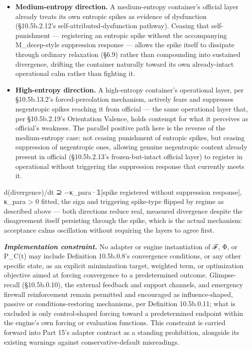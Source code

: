 \documentclass[
]{article}
\begin{document}
\begin{itemize}
\item
  \textbf{Medium-entropy direction.} A medium-entropy container's
  official layer already treats its own entropic spikes as evidence of
  dysfunction (§10.5b.2.12's self-attributed-dysfunction pathway).
  Ceasing that self-punishment --- registering an entropic spike without
  the accompanying M\_decep-style suppression response --- allows the
  spike itself to dissipate through ordinary relaxation (§6.9) rather
  than compounding into sustained divergence, drifting the container
  naturally toward its own already-intact operational calm rather than
  fighting it.
\item
  \textbf{High-entropy direction.} A high-entropy container's
  operational layer, per §10.5b.13.2's forced-percolation mechanism,
  actively fears and suppresses negentropic spikes reaching it from
  official --- the same operational layer that, per §10.5b.2.19's
  Orientation Valence, holds contempt for what it perceives as
  official's weakness. The parallel positive path here is the reverse of
  the medium-entropy case: not ceasing punishment of entropic spikes,
  but ceasing suppression of negentropic ones, allowing genuine
  negentropic content already present in official (§10.5b.2.13's
  frozen-but-intact official layer) to register in operational without
  triggering the suppression response that currently meets it.
\end{itemize}

d(divergence)/dt ⊇ −κ\_para·𝟙{[}spike registered without suppression
response{]}, κ\_para \textgreater{} 0 fitted, the sign and triggering
spike-type flipped by regime as described above --- both directions
reduce real, measured divergence despite the disagreement itself
persisting through the spike, which is the actual mechanism: acceptance
calms oscillation without requiring the layers to agree first.

\emph{\textbf{Implementation constraint.}} No adapter or engine
instantiation of ℱ, Φ, or P\_C(t) may include Definition 10.5b.0.8's
convergence conditions, or any other specific state, as an explicit
minimization target, weighted term, or optimization objective aimed at
forcing convergence to a predetermined outcome. Glimpse-recall
(§10.5b.0.10), the external feedback and support channels, and emergency
firewall reinforcement remain permitted and encouraged as
influence-shaped, passive or conditions-restoring mechanisms, per
Definition 10.5b.0.11; what is excluded is only control-shaped forcing
toward a predetermined endpoint within the engine's own forcing or
evaluation functions. This constraint is carried forward into Part 15's
adapter contract as a standing prohibition, alongside its existing
warnings against conservative-default misreadings.
\end{document}
